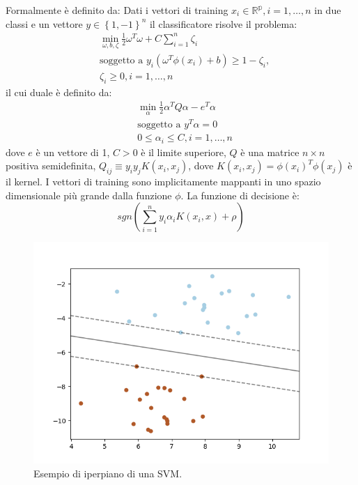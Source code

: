 \begin{itemize}
Formalmente è definito da:
Dati i vettori di training $x_i \in \mathbb{R^p}, i=1,\dots,n$ in due classi e un vettore $y \in \left\lbrace1,-1\right\rbrace^n$ il classificatore risolve il problema:
\begin{align*}
& \min_{\omega,b,\zeta} \frac{1}{2} \omega^T \omega + C  \displaystyle\sum_{i=1}^n \zeta_i \\
&\text{soggetto a } y_i(\omega^T \phi(x_i) + b) \geq 1 - \zeta_i, \\
&\zeta_i \geq 0, i =1,\dots,n
\end{align*}
il cui duale è definito da:
\begin{align*}
& \min_{\alpha} \frac{1}{2} \alpha^T Q\alpha - e^T \alpha \\
&\text{soggetto a } y^T \alpha = 0 \\
& 0 \leq \alpha_i \leq C, i = 1, \dots, n
\end{align*}
dove $e$ è un vettore di 1, $C > 0$ è il limite superiore, $Q$ è una matrice $n \times n$ positiva semidefinita, $Q_{ij} \equiv y_iy_jK(x_i,x_j)$, dove $K(x_i,x_j) = \phi(x_i)^T \phi(x_j)$ è il kernel. I vettori di training sono implicitamente mappanti in uno spazio dimensionale più grande dalla funzione $\phi$. 
La funzione di decisione è:
\[ sgn \left(\displaystyle\sum_{i=1}^n y_i \alpha_i K(x_i,x) + \rho \right) \] 

\begin{figure}[!bp]
    \centering
    \includegraphics[width=\columnwidth]{figures/svm.png}
    \caption{Esempio di iperpiano di una SVM. \label{fig:svm}}
\end{figure}


\end{itemize}
